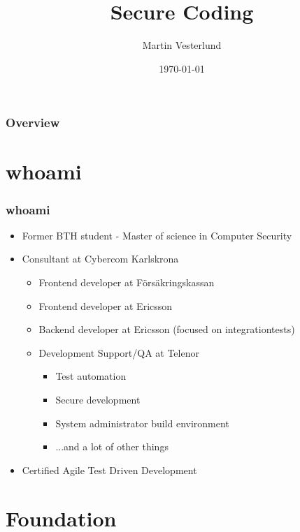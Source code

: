 \documentclass{beamer}
\title[Secure Coding]{Secure Coding }
\author{Martin Vesterlund}
\institute[Cybercom]
{
Cybercom Group AB \\
\medskip
\textit{martin.vesterlund@cybercom.com}
}
\date{\today}
\begin{document}
\begin{frame}
  \titlepage %
\end{frame}

\begin{frame}
  \frametitle{Overview}
  \tableofcontents
\end{frame}

\section{whoami}
\begin{frame}
  \frametitle{whoami}
  \begin{itemize}
    \item Former BTH student - Master of science in Computer Security
    \item Consultant at Cybercom Karlskrona
    \begin{itemize}
      \item Frontend developer at Försäkringskassan
      \item Frontend developer at Ericsson
      \item Backend developer at Ericsson (focused on integrationtests)
      \item Development Support/QA at Telenor
      \begin{itemize}
        \item Test automation
        \item Secure development
        \item System administrator build environment
        \item ...and a lot of other things
      \end{itemize}
    \end{itemize}
    \item Certified Agile Test Driven Development
  \end{itemize}
\end{frame}

\section{Foundation}
\end{document}
